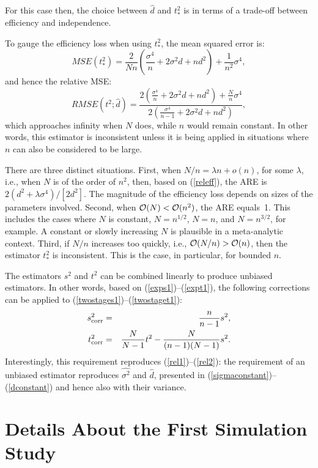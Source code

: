 \documentclass[11pt,a5paper,twoside]{book}
\begin{document}
{For this case then, the choice between $\widehat{d}$ and $t^2_\ast$ 
is in terms of a trade-off between efficiency and independence.

To gauge the efficiency loss when using $t^2_\ast$, the mean 
squared error is:
$$MSE(t^2_\ast)=\frac{2}{Nn}\left(\frac{\sigma^4}{n}+2\sigma^2d+nd^2\right)+\frac{1}{n^2}\sigma^4,$$
and hence the relative MSE:
\begin{equation}
\label{releff}
RMSE(t^2;\widehat{d})=\frac
{
2\left(\frac{\sigma^4}{n}+2\sigma^2d+nd^2\right)+\frac{N}{n}\sigma^4
}
{
2\left(\frac{\sigma^4}{n-1}+2\sigma^2d+nd^2\right)
},
\end{equation}
which approaches infinity when $N$ does, while $n$ would 
remain constant. In other words, this estimator is inconsistent 
unless it is being applied in situations where $n$ can also be considered 
to be large.

There are three distinct situations. First, when $N/n=\lambda n+o(n)$, 
for some $\lambda$, i.e., when $N$ is of the order of $n^2$, then, 
based on (\ref{releff}), the ARE is $2(d^2+\lambda\sigma^4)/[2d^2]$. 
The magnitude of the efficiency loss depends on sizes of the parameters involved. 
Second, when ${\cal O}(N)<{\cal O}(n^2)$, the ARE equals~1. This includes 
the cases where $N$ is constant, $N=n^{1/2}$, $N=n$, and $N=n^{3/2}$, for 
example. A constant or slowly increasing $N$ is plausible in a meta-analytic 
context. Third,  if $N/n$ increases too quickly, i.e., 
${\cal O}(N/n)>{\cal O}(n)$, then the estimator $t^2_\ast$ is inconsistent. 
This is the case, in particular, for bounded $n$.

The estimators $s^2$ and $t^2$ can be combined 
linearly to produce unbiased estimators. In other words, 
based on (\ref{exps1})--(\ref{expt1}), the following 
corrections can be applied to (\ref{twostages1})--(\ref{twostaget1}):
\begin{eqnarray}
s^2_{\mbox{\scriptsize corr}}&=&\frac{n}{n-1}s^2,\\
t^2_{\mbox{\scriptsize corr}}&=&\frac{N}{N-1}t^2-\frac{N}{(n-1)(N-1)}s^2.
\end{eqnarray}
Interestingly, this requirement reproduces (\ref{rel1})--(\ref{rel2}): 
the requirement of an unbiased estimator reproduces $\widehat{\sigma^2}$ 
and $\widehat{d}$, presented in
(\ref{sigmaconstant})--(\ref{dconstant}) and hence also with their variance.



\setcounter{equation}{0}
\section{Details About the First Simulation Study}
\label{simapp}

}
\end{document}
